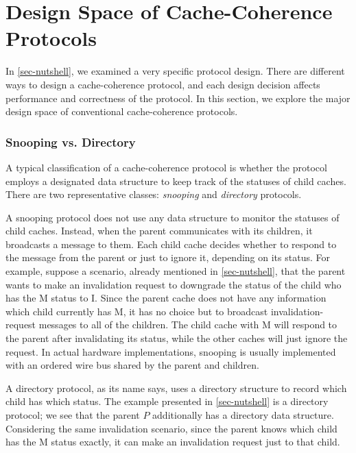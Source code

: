 
\section{Design Space of Cache-Coherence Protocols}
\label{sec-design-space}

In \autoref{sec-nutshell}, we examined a very specific protocol design.
There are different ways to design a cache-coherence protocol, and each design decision affects performance and correctness of the protocol.
In this section, we explore the major design space of conventional cache-coherence protocols.

\subsubsection{Snooping vs. Directory}

A typical classification of a cache-coherence protocol is whether the protocol employs a designated data structure to keep track of the statuses of child caches.
There are two representative classes: \emph{snooping} and \emph{directory} protocols.

A snooping protocol does not use any data structure to monitor the statuses of child caches.
Instead, when the parent communicates with its children, it broadcasts a message to them.
Each child cache decides whether to respond to the message from the parent or just to ignore it, depending on its status.
For example, suppose a scenario, already mentioned in \autoref{sec-nutshell}, that the parent wants to make an invalidation request to downgrade the status of the child who has the M status to I.
Since the parent cache does not have any information which child currently has M, it has no choice but to broadcast invalidation-request messages to all of the children.
The child cache with M will respond to the parent after invalidating its status, while the other caches will just ignore the request.
In actual hardware implementations, snooping is usually implemented with an ordered wire bus shared by the parent and children.

A directory protocol, as its name says, uses a directory structure to record which child has which status.
The example presented in \autoref{sec-nutshell} is a directory protocol; we see that the parent $P$ additionally has a directory data structure.
Considering the same invalidation scenario, since the parent knows which child has the M status exactly, it can make an invalidation request just to that child.

